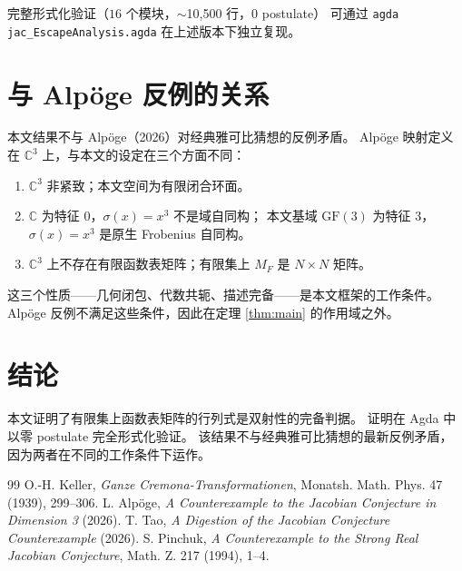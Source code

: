 \documentclass[a4paper,11pt]{article}
\theoremstyle{remark}
\newcommand{\GF}{\mathrm{GF}}
\newcommand{\C}{\mathbb{C}}
\newcommand{\MF}{M_F}
\newcommand{\Frob}{\sigma}
\begin{document}
完整形式化验证（$16$ 个模块，$\sim$10,500 行，$0$ postulate）
可通过 \texttt{agda jac\_EscapeAnalysis.agda} 在上述版本下独立复现。

\section{与 Alp\"{o}ge 反例的关系}

本文结果不与 Alp\"{o}ge（2026）对经典雅可比猜想的反例矛盾。
Alp\"{o}ge 映射定义在 $\C^3$ 上，与本文的设定在三个方面不同：

\begin{enumerate}
\item $\C^3$ 非紧致；本文空间为有限闭合环面。
\item $\C$ 为特征 $0$，$\Frob(x)=x^3$ 不是域自同构；
本文基域 $\GF(3)$ 为特征 $3$，$\Frob(x)=x^3$ 是原生 Frobenius 自同构。
\item $\C^3$ 上不存在有限函数表矩阵；有限集上 $\MF$ 是 $N\times N$ 矩阵。
\end{enumerate}

这三个性质——几何闭包、代数共轭、描述完备——是本文框架的工作条件。
Alp\"{o}ge 反例不满足这些条件，因此在定理 \ref{thm:main} 的作用域之外。

\section{结论}

本文证明了有限集上函数表矩阵的行列式是双射性的完备判据。
证明在 Agda 中以零 postulate 完全形式化验证。
该结果不与经典雅可比猜想的最新反例矛盾，
因为两者在不同的工作条件下运作。

\begin{thebibliography}{99}
 O.-H. Keller, \textit{Ganze Cremona-Transformationen}, Monatsh. Math. Phys. 47 (1939), 299--306.
 L. Alp\"{o}ge, \textit{A Counterexample to the Jacobian Conjecture in Dimension 3} (2026).
 T. Tao, \textit{A Digestion of the Jacobian Conjecture Counterexample} (2026).
 S. Pinchuk, \textit{A Counterexample to the Strong Real Jacobian Conjecture}, Math. Z. 217 (1994), 1--4.
\end{thebibliography}
\end{document}
